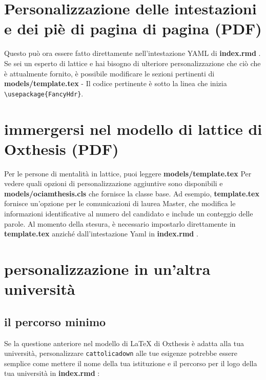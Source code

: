 \documentclass[a4paper, 11pt, nobind]{templates/ociamthesis}
\begin{document}
\hypertarget{personalizzazione-delle-intestazioni-e-dei-piuxe8-di-pagina-di-pagina-pdf}{%
\section{Personalizzazione delle intestazioni e dei piè di pagina di pagina (PDF)}\label{personalizzazione-delle-intestazioni-e-dei-piuxe8-di-pagina-di-pagina-pdf}}

Questo può ora essere fatto direttamente nell'intestazione YAML di \textbf{index.rmd }.
Se sei un esperto di lattice e hai bisogno di ulteriore personalizzazione che ciò che è attualmente fornito, è possibile modificare le sezioni pertinenti di \textbf{models/template.tex } - Il codice pertinente è sotto la linea che inizia \texttt{\textbackslash{}usepackage\{FancyHdr\}}.

\hypertarget{immergersi-nel-modello-di-lattice-di-oxthesis-pdf}{%
\section{immergersi nel modello di lattice di Oxthesis (PDF)}\label{immergersi-nel-modello-di-lattice-di-oxthesis-pdf}}

Per le persone di mentalità in lattice, puoi leggere \textbf{models/template.tex } Per vedere quali opzioni di personalizzazione aggiuntive sono disponibili e \textbf{models/ociamthesis.cls } che fornisce la classe base.
Ad esempio, \textbf{template.tex } fornisce un'opzione per le comunicazioni di laurea Master, che modifica le informazioni identificative al numero del candidato e include un conteggio delle parole.
Al momento della stesura, è necessario impostarlo direttamente in \textbf{template.tex } anziché dall'intestazione Yaml in \textbf{index.rmd }.

\hypertarget{personalizzazione-in-unaltra-universituxe0}{%
\section{personalizzazione in un'altra università}\label{personalizzazione-in-unaltra-universituxe0}}

\hypertarget{il-percorso-minimo}{%
\subsection{il percorso minimo}\label{il-percorso-minimo}}

Se la questione anteriore nel modello di LaTeX di Oxthesis è adatta alla tua università, personalizzare \texttt{cattolicadown} alle tue esigenze potrebbe essere semplice come mettere il nome della tua istituzione e il percorso per il logo della tua università in \textbf{index.rmd }:
\end{document}
